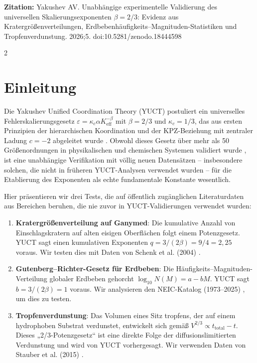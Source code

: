 \documentclass[11pt,a4paper]{article}
\newcommand{\eps}{\varepsilon}
\newcommand{\kappac}{\kappa_c}
\newcommand{\Keff}{K_{\mathrm{eff}}}
\newcommand{\betaf}{\beta}
\begin{document}
	\vspace{0.1cm}
	\noindent
	{\color{darkblue}\textbf{Zitation:}} Yakushev AV. Unabhängige experimentelle Validierung des universellen Skalierungsexponenten \(\beta = 2/3\): Evidenz aus Kratergrößenverteilungen, Erdbebenhäufigkeits–Magnituden-Statistiken und Tropfenverdunstung. 2026;5. doi:10.5281/zenodo.18444598
	
	\vspace{0.4cm}
	\vspace*{-\baselineskip}
	\begin{multicols}{2}
		
		\section{Einleitung}
		
		Die Yakushev Unified Coordination Theory (YUCT) postuliert ein universelles Fehlerskalierungsgesetz \(\eps = \kappac \alpha \Keff^{-\betaf}\) mit \(\betaf = 2/3\) und \(\kappac = 1/3\), das aus ersten Prinzipien der hierarchischen Koordination und der KPZ-Beziehung mit zentraler Ladung \(c = -2\) abgeleitet wurde \cite{AppendixY, AppendixL}. Obwohl dieses Gesetz über mehr als 50 Größenordnungen in physikalischen und chemischen Systemen validiert wurde \cite{AppendixC, AppendixG}, ist eine unabhängige Verifikation mit völlig neuen Datensätzen – insbesondere solchen, die nicht in früheren YUCT-Analysen verwendet wurden – für die Etablierung des Exponenten als echte fundamentale Konstante wesentlich.
		
		Hier präsentieren wir drei Tests, die auf öffentlich zugänglichen Literaturdaten aus Bereichen beruhen, die nie zuvor in YUCT-Validierungen verwendet wurden:
		
		\begin{enumerate}
			\item \textbf{Kratergrößenverteilung auf Ganymed}: Die kumulative Anzahl von Einschlagskratern auf alten eisigen Oberflächen folgt einem Potenzgesetz. YUCT sagt einen kumulativen Exponenten \(q = 3/(2\betaf) = 9/4 = 2,25\) voraus. Wir testen dies mit Daten von Schenk et al. (2004) \cite{Schenk2004}.
			\item \textbf{Gutenberg–Richter-Gesetz für Erdbeben}: Die Häufigkeits–Magnituden-Verteilung globaler Erdbeben gehorcht \(\log_{10} N(M) = a - bM\). YUCT sagt \(b = 3/(2\betaf) = 1\) voraus. Wir analysieren den NEIC-Katalog (1973–2025) \cite{USGSNEIC}, um dies zu testen.
			\item \textbf{Tropfenverdunstung}: Das Volumen eines Sitz tropfens, der auf einem hydrophoben Substrat verdunstet, entwickelt sich gemäß \(V^{2/3} \propto t_{\text{total}} - t\). Dieses „2/3-Potenzgesetz“ ist eine direkte Folge der diffusionslimitierten Verdunstung und wird von YUCT vorhergesagt. Wir verwenden Daten von Stauber et al. (2015) \cite{Stauber2015}.
		\end{enumerate}
		

\end{multicols}
\end{document}
